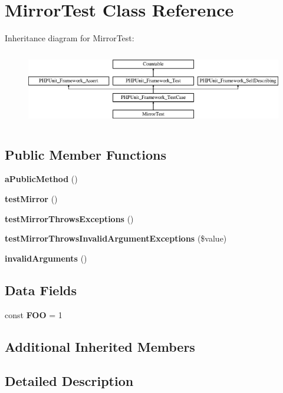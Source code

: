 \section{Mirror\+Test Class Reference}
\label{class_psy_1_1_test_1_1_util_1_1_mirror_test}
Inheritance diagram for Mirror\+Test\+:\begin{figure}[H]
\begin{center}
\leavevmode
\includegraphics[height=3.303835cm]{class_psy_1_1_test_1_1_util_1_1_mirror_test}
\end{center}
\end{figure}
\subsection*{Public Member Functions}
\begin{DoxyCompactItemize}
\item 
{\bf a\+Public\+Method} ()
\item 
{\bf test\+Mirror} ()
\item 
{\bf test\+Mirror\+Throws\+Exceptions} ()
\item 
{\bf test\+Mirror\+Throws\+Invalid\+Argument\+Exceptions} (\$value)
\item 
{\bf invalid\+Arguments} ()
\end{DoxyCompactItemize}
\subsection*{Data Fields}
\begin{DoxyCompactItemize}
\item 
const {\bf F\+O\+O} = 1
\end{DoxyCompactItemize}
\subsection*{Additional Inherited Members}


\subsection{Detailed Description}


